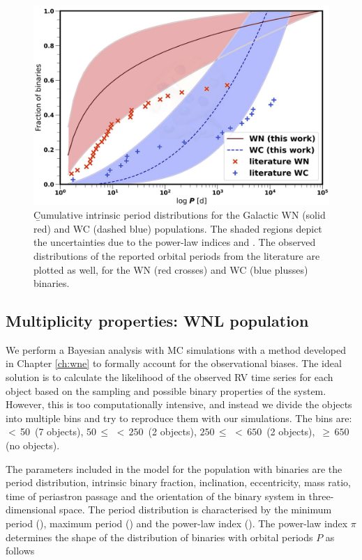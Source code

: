 \begin{figure}
    \centering
    \includegraphics[width=\hsize]{chapters/WNL/image/Cum_dist_theory_final.png}
    \caption{\b{Cumulative intrinsic period distributions for the Galactic WN (solid red) and WC (dashed blue) populations. The shaded regions depict the uncertainties due to the power-law indices \piWN{} and \piWC{}. The observed distributions of the reported orbital periods from the literature are plotted as well, for the WN (red crosses) and WC (blue plusses) binaries.}}
    \label{fig:intrinsic_pdists}
\end{figure}

\subsection{Multiplicity properties: WNL population} \label{sect:WNL_multiplicity}

We perform a Bayesian analysis with MC simulations with a method developed in Chapter \ref{ch:wne} to formally account for the observational biases. The ideal solution is to calculate the likelihood of the observed RV time series for each object based on the sampling and possible binary properties of the system. However, this is too computationally intensive, and instead we divide the objects into multiple \DelRV{} bins and try to reproduce them with our simulations. The \DelRV{} bins are: \DelRV{}\,$<$\,50\,\kms{} (7 objects), $50\,\le\,$\DelRV{}$\,<\,250\,$\kms{} (2 objects), $250\,\le\,$\DelRV{}$\,<\,650\,$\kms{} (2 objects), \DelRV{}\,$\ge\,650\,$\kms{} (no objects).

The parameters included in the model for the population with binaries are the period distribution, intrinsic binary fraction, inclination, eccentricity, mass ratio, time of periastron passage and the orientation of the binary system in three-dimensional space. The period distribution is characterised by the minimum period (\logPminWNL{}), maximum period (\logPmaxWNL) and the power-law index (\piWNL{}). The power-law index $\pi$ determines the shape of the distribution of binaries with orbital periods $P$ as follows

